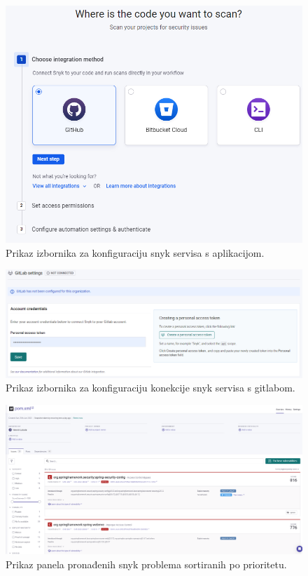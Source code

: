 \documentclass[a4paper,12pt,oneside]{article}
\begin{document}
\begin{figure}
    \centering
    \includegraphics[width=0.6\linewidth]{Slike/snyk-select-git.png}
    \caption{Prikaz izbornika za konfiguraciju snyk servisa s aplikacijom.\cite{snyk}}
    \label{fig:snyk-select-git}
\end{figure}

\begin{figure}
    \centering
    \includegraphics[width=1\linewidth]{Slike/snyk-gitlab-token.png}
    \caption{Prikaz izbornika za konfiguraciju konekcije snyk servisa s gitlabom.\cite{snyk}}
    \label{fig:snyk-gitlab-token}
\end{figure}

\begin{figure}
    \centering
    \includegraphics[width=1\linewidth]{Slike/snyk-issues.png}
    \caption{Prikaz panela pronađenih snyk problema sortiranih po prioritetu.\cite{snyk}}
    \label{fig:snyk-issues}
\end{figure}
\end{document}
